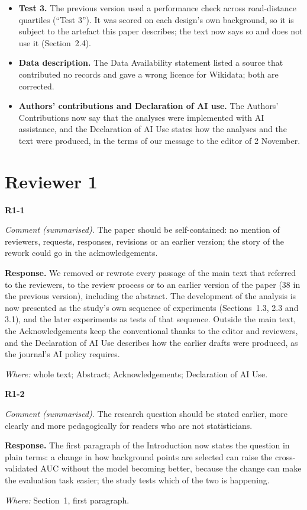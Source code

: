 \documentclass[11pt,a4paper]{article}
\newcommand{\comment}[1]{\par\noindent\textit{Comment (summarised).} #1\par}
\newcommand{\response}{\par\noindent\textbf{Response.} }
\newcommand{\where}[1]{\par\noindent\textit{Where:} #1\par\medskip}
\begin{document}
\begin{itemize}
        composition of the whole background pool (Section~2.3).
  \item \textbf{Test 3.} The previous version used a performance check across road-distance quartiles (``Test 3'').
        It was scored on each design's own background, so it is subject to the artefact this paper describes; the
        text now says so and does not use it (Section~2.4).
  \item \textbf{Data description.} The Data Availability statement listed a source that contributed no records and
        gave a wrong licence for Wikidata; both are corrected.
  \item \textbf{Authors' contributions and Declaration of AI use.} The Authors' Contributions now say that the
        analyses were implemented with AI assistance, and the Declaration of AI Use states how the analyses and the
        text were produced, in the terms of our message to the editor of 2 November.
\end{itemize}

\section*{Reviewer 1}

\textbf{R1-1}
\comment{The paper should be self-contained: no mention of reviewers, requests, responses, revisions or an earlier
version; the story of the rework could go in the acknowledgements.}
\response We removed or rewrote every passage of the main text that referred to the reviewers, to the review process or
to an earlier version of the paper (38 in the previous version), including the abstract. The development of the
analysis is now presented as the study's own sequence of experiments (Sections~1.3, 2.3 and 3.1), and the later
experiments as tests of that sequence. Outside the main text, the Acknowledgements keep the conventional thanks to the
editor and reviewers, and the Declaration of AI Use describes how the earlier drafts were produced, as the journal's AI
policy requires.
\where{whole text; Abstract; Acknowledgements; Declaration of AI Use.}

\textbf{R1-2}
\comment{The research question should be stated earlier, more clearly and more pedagogically for readers who are not
statisticians.}
\response The first paragraph of the Introduction now states the question in plain terms: a change in how background
points are selected can raise the cross-validated AUC without the model becoming better, because the change can make the
evaluation task easier; the study tests which of the two is happening.
\where{Section~1, first paragraph.}
\end{document}
